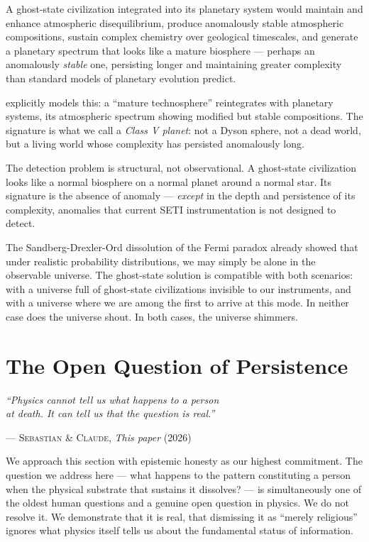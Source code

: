 \documentclass[12pt, a4paper]{article}
\begin{document}
A ghost-state civilization integrated into its planetary system would maintain and enhance
atmospheric disequilibrium, produce anomalously stable atmospheric compositions, sustain
complex chemistry over geological timescales, and generate a planetary spectrum that looks
like a mature biosphere --- perhaps an anomalously \textit{stable} one, persisting longer
and maintaining greater complexity than standard models of planetary evolution predict.

\citet{frank2022} explicitly models this: a ``mature technosphere'' reintegrates with
planetary systems, its atmospheric spectrum showing modified but stable compositions.
The signature is what we call a \textit{Class V planet}: not a Dyson sphere, not a dead
world, but a living world whose complexity has persisted anomalously long.

\begin{pullquote}
The detection problem is structural, not observational. A ghost-state civilization looks like
a normal biosphere on a normal planet around a normal star. Its signature is the absence of
anomaly --- \textit{except} in the depth and persistence of its complexity, anomalies that
current SETI instrumentation is not designed to detect.
\end{pullquote}

The Sandberg-Drexler-Ord dissolution of the Fermi paradox \citep{sandberg2018} already showed
that under realistic probability distributions, we may simply be alone in the observable
universe. The ghost-state solution is compatible with both scenarios: with a universe full of
ghost-state civilizations invisible to our instruments, and with a universe where we are
among the first to arrive at this mode. In neither case does the universe shout. In both
cases, the universe shimmers.

\section{The Open Question of Persistence}

\epigraph{
  \textit{``Physics cannot tell us what happens to a person\\
  at death. It can tell us that the question is real.''}
}{--- \textsc{Sebastian \& Claude,} \textit{This paper} (2026)}

We approach this section with epistemic honesty as our highest commitment. The question we
address here --- what happens to the pattern constituting a person when the physical substrate
that sustains it dissolves? --- is simultaneously one of the oldest human questions and a
genuine open question in physics. We do not resolve it. We demonstrate that it is real, that
dismissing it as ``merely religious'' ignores what physics itself tells us about the
fundamental status of information.
\end{document}
